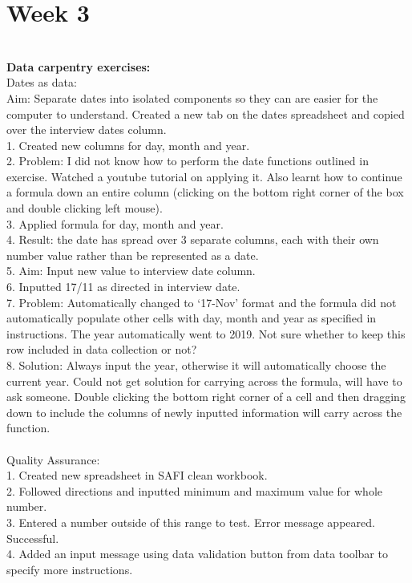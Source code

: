 \documentclass{article}
\begin{document}
\section{Week 3}\\
\textbf{Data carpentry exercises:}\\
Dates as data:\\
Aim: Separate dates into isolated components so they can are easier for the computer to understand. 
Created a new tab on the dates spreadsheet and copied over the interview dates column.\\
1. Created new columns for day, month and year.\\
2. Problem: I did not know how to perform the date functions outlined in exercise. Watched a youtube tutorial on applying it. Also learnt how to continue a formula down an entire column (clicking on the bottom right corner of the box and double clicking left mouse).\\
3. Applied formula for day, month and year.\\
4. Result: the date has spread over 3 separate columns, each with their own number value rather than be represented as a date. \\
5. Aim: Input new value to interview date column.\\
6. Inputted 17/11 as directed in interview date.\\
7. Problem: Automatically changed to ‘17-Nov’ format and the formula did not automatically populate other cells with day, month and year as specified in instructions. The year automatically went to 2019. Not sure whether to keep this row included in data  collection or not?\\
8. Solution: Always input the year, otherwise it will automatically choose the current year. Could not get solution for carrying across the formula, will have to ask someone. Double clicking the bottom right corner of a cell and then dragging down to include the columns of newly inputted information will carry across the function. \\
\\
Quality Assurance:\\
1. Created new spreadsheet in SAFI clean workbook.\\
2. Followed directions and inputted minimum and maximum value for whole number.\\
3. Entered a number outside of this range to test. Error message appeared. Successful.\\
4. Added an input message using data validation button from data toolbar to specify more instructions. \\
\end{document}
